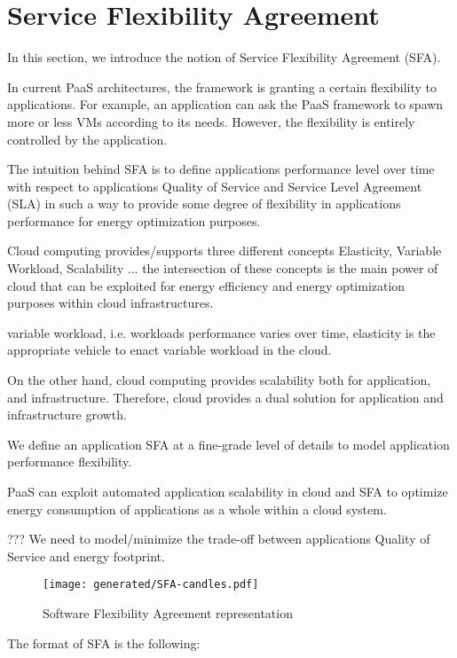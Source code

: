 \section{Service Flexibility Agreement}
In this section, we introduce the notion of Service Flexibility Agreement (SFA). 

In current PaaS architectures, the framework is granting a certain flexibility to applications.
For example, an application can ask the PaaS framework to spawn more or less VMs according to its needs.
However, the flexibility is entirely controlled by the application.


The intuition behind SFA is to define applications performance level over time with respect to applications Quality of Service and Service Level Agreement (SLA) in such a way to provide some degree of flexibility in applications performance for energy optimization purposes. 



Cloud computing provides/supports three different concepts Elasticity, Variable Workload, Scalability  ... the intersection of these concepts is the main power of cloud that can be exploited for energy efficiency and energy optimization purposes within cloud infrastructures.

variable workload, i.e. workloads performance varies over time, elasticity is the appropriate vehicle to enact variable workload in the cloud.

On the other hand, cloud computing provides scalability both for application, and infrastructure. Therefore, cloud provides a dual solution for application and infrastructure growth.


We define an application SFA at a fine-grade level of details to model application performance flexibility.
 
PaaS can exploit automated application scalability in cloud and SFA to optimize energy consumption of applications as a whole within a cloud system.

???
We need to model/minimize the trade-off between applications Quality of Service and energy footprint.

\begin{figure}[h]
\centering
\texttt{[image: generated/SFA-candles.pdf]}
\caption{Software Flexibility Agreement representation}
\label{fig:EASC}
\end{figure}


The format of SFA is the following:

